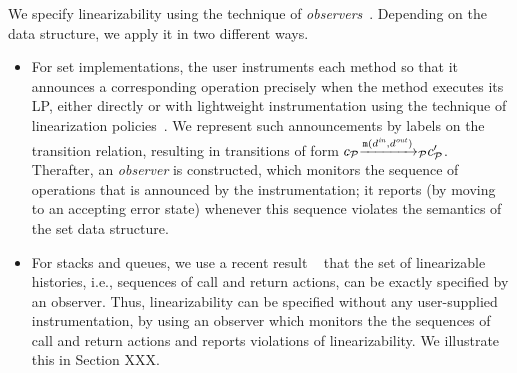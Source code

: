 

We specify linearizability using the technique of
{\em observers}~\cite{AHHR:integrated,BEEH:icalp15,HSV:concur13,Quy:sas16}.
Depending on the data structure, we apply it in two different ways.
\begin{itemize}
    \item For set implementations,
the user instruments each method so that it announces
a corresponding operation precisely when the method executes its LP, either
directly or with lightweight instrumentation using
the technique of linearization policies~\cite{Quy:sas16}.
We represent such announcements by labels on the transition relation, resulting
in transitions of form
$c_{{\mathcal P}}{\xrightarrow{{\tt m}(d^{\it in},d^{\it out})}{}}_{\!\!{\mathcal P}}c_{{\mathcal P}}'$.
Therafter, an {\em observer} is constructed, which
monitors the sequence of operations that is announced by the
instrumentation; it reports (by moving to an accepting error state)
whenever this sequence violates the semantics of the set data structure.
\item
  For stacks and queues, we use a recent result
~\cite{BEEH:icalp15,HSV:concur13} that the set of linearizable histories,
i.e., sequences of call and return actions,
can be exactly specified by an observer.
Thus, linearizability can be specified without
any user-supplied instrumentation, by using an observer which monitors
the the sequences of call and return actions and reports violations of
linearizability.
We illustrate this in Section XXX.
\end{itemize}


